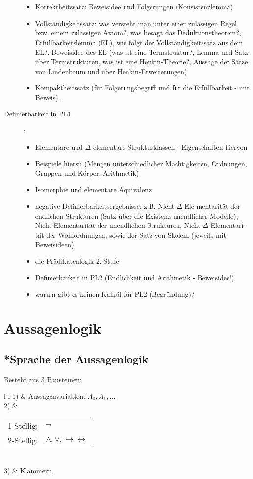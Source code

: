 \documentclass[12pt,a4paper]{article} %
\begin{document}
\begin{description}
\begin{itemize}
			\item Korrektheitssatz: Beweisidee und Folgerungen (Konsistenzlemma)
			\item Vollständigkeitssatz: was versteht man unter einer zulässigen Regel bzw.
			einem zulässigen Axiom?, was besagt das Deduktionstheorem?, Erfüllbarkeitslemma (EL),
			wie folgt der Vollständigkeitssatz aus dem EL?, Beweisidee des EL (was ist eine
			Termstruktur?, Lemma und Satz über Termstrukturen, was ist eine Henkin-Theorie?, Aussage der Sätze von Lindenbaum und über Henkin-Erweiterungen)
			\item Kompaktheitssatz (für Folgerungsbegriff und für die Erfüllbarkeit - mit Beweis).
		\end{itemize}
		\item[Definierbarkeit in PL1]:
		\begin{itemize}
			\item Elementare und $\Delta$-elementare Strukturklassen - Eigenschaften
			hiervon
			\item Beispiele hierzu (Mengen unterschiedlicher Mächtigkeiten, Ordnungen, Gruppen
			und Körper; Arithmetik)
			\item Isomorphie und elementare Äquivalenz
			\item negative Definierbarkeitsergebnisse: z.B. Nicht-$\Delta$-Ele-mentarität der endlichen Strukturen (Satz über die Existenz unendlicher Modelle), Nicht-Elementarität der unendlichen Strukturen, Nicht-$\Delta$-Elementari-tät der Wohlordnungen, sowie der Satz von Skolem (jeweils mit Beweisideen)
			\item die Prädikatenlogik 2. Stufe
			\item Definierbarkeit in PL2 (Endlichkeit und Arithmetik - Beweisidee!)
			\item warum gibt es keinen Kalkül für PL2 (Begründung)?
		\end{itemize}
	\end{description}
	
	\newpage
	\tableofcontents
	\newpage
	
	\section{Aussagenlogik}
	\subsection{*Sprache der Aussagenlogik}
	\label{ALSprache}
	Besteht aus 3 Bausteinen:
	
	\begin{tabular}{l l}
		1) & Aussagenvariablen: $A_0, A_1, ...$ \\
		2) & \begin{tabular}{l l}
			1-Stellig: & $\neg$ \\
			2-Stellig: & $\land, \lor, \rightarrow \leftrightarrow$
		\end{tabular} \\
		3) & Klammern
	\end{tabular}
\end{document}
